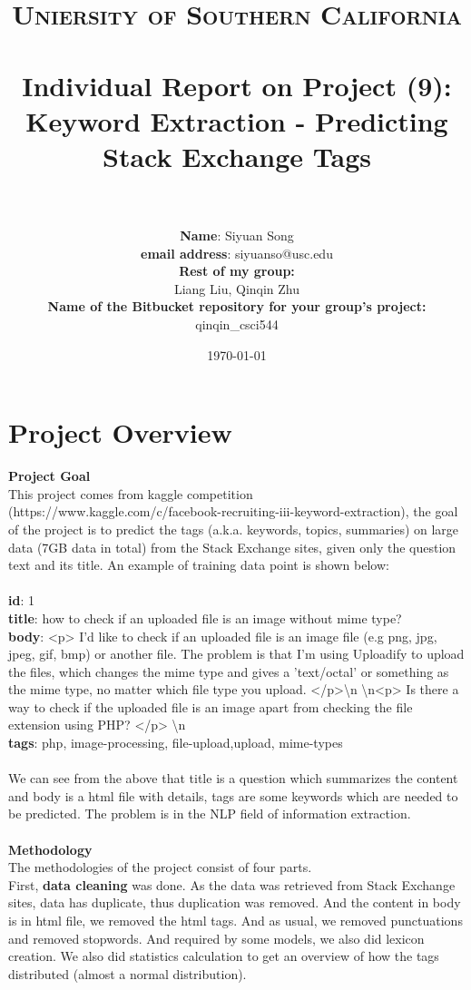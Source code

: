 \documentclass[paper=a4, fontsize=11pt]{scrartcl} %
\title{	
\normalfont \normalsize 
\textsc{Uniersity of Southern California} \\ [25pt] %
\horrule{0.5pt} \\[0.4cm] %
\huge Individual Report on Project (9):  Keyword Extraction - Predicting Stack Exchange Tags\\ %
\horrule{2pt} \\[0.5cm] %
}
\author{
 \textbf{Name}: Siyuan Song \\
 \textbf{email address}: siyuanso@usc.edu\\
\textbf{Rest of my group:} \\
Liang Liu, Qinqin Zhu\\
\textbf{Name of the Bitbucket repository for your group's project:} \\
qinqin\_csci544
} %
\date{\normalsize\today} %
\numberwithin{equation}{section} %
\numberwithin{figure}{section} %
\numberwithin{table}{section} %
\begin{document}
\maketitle %


\section{Project Overview}
{\bf Project Goal}\\
This project comes from kaggle competition (https://www.kaggle.com/c/facebook-recruiting-iii-keyword-extraction), the goal of the project is to predict the tags (a.k.a. keywords, topics, summaries) on large data (7GB data in total) from the Stack Exchange sites, given only the question text and its title. An example of training data point is shown below:\\
\ \\
{\bf id}: 1 \\
{\bf title}: how to check if an uploaded file is an image without mime type? \\
{\bf body}:  <p> I'd like to check if an uploaded file is an image file (e.g png, jpg, jpeg, gif, bmp) or another file. The problem is that I'm using Uploadify to upload the files, which changes the mime type and gives a 'text/octal' or something as the mime type, no matter which file type you upload. </p>\textbackslash n \textbackslash n<p> Is there a way to check if the uploaded file is an image apart from checking the file extension using PHP? </p> \textbackslash n\\
{\bf tags}: php, image-processing, file-upload,upload, mime-types \\
\ \\
We can see from the above that title is a question which summarizes the content and body is a html file with details, tags are some keywords which are needed to be predicted. The problem is in the NLP field of information extraction.\\
\ \\
{\bf Methodology} \\
The methodologies of the project consist of four parts. \\
First, {\bf data cleaning} was done. As the data was retrieved from Stack Exchange sites, data has duplicate, thus duplication was removed. And the content in body is in html file, we removed the html tags. And as usual, we removed punctuations and removed stopwords. And required by some models, we also did  lexicon creation. We also did statistics calculation to get an overview of how the tags distributed (almost a normal distribution).\\
\end{document}
